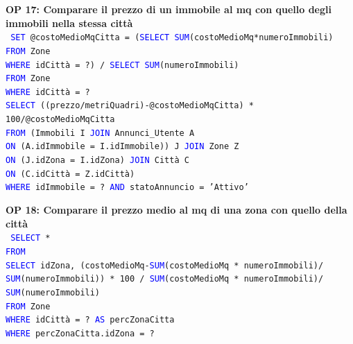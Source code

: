 \documentclass[a4paper,12pt]{report}
\begin{document}
            \noindent
            \textbf{OP 17: Comparare il prezzo di un immobile al mq con quello degli immobili nella stessa città} \\
            \texttt{
                \textcolor{blue}{SET} @costoMedioMqCitta = (\textcolor{blue}{SELECT SUM}(costoMedioMq*numeroImmobili) \\
                    \null\qquad\qquad\qquad\qquad\qquad\qquad\quad\textcolor{blue}{FROM} Zone \\
                    \null\qquad\qquad\qquad\qquad\qquad\qquad\quad\textcolor{blue}{WHERE} idCittà = ?) / \textcolor{blue}{SELECT SUM}(numeroImmobili) \\
                        \null\qquad\qquad\qquad\qquad\qquad\qquad\qquad\qquad\qquad\qquad\qquad\qquad\textcolor{blue}{FROM} Zone  \\
                        \null\qquad\qquad\qquad\qquad\qquad\qquad\qquad\qquad\qquad\qquad\qquad\qquad\textcolor{blue}{WHERE} idCittà = ? \\
                \textcolor{blue}{SELECT} ((prezzo/metriQuadri)-@costoMedioMqCitta) * 100/@costoMedioMqCitta \\
                \textcolor{blue}{FROM} (Immobili I \textcolor{blue}{JOIN} Annunci\_Utente A  \\
                \textcolor{blue}{ON} (A.idImmobile = I.idImmobile)) J \textcolor{blue}{JOIN} Zone Z \\
                \textcolor{blue}{ON} (J.idZona = I.idZona) \textcolor{blue}{JOIN} Città C \\
                \textcolor{blue}{ON} (C.idCittà = Z.idCittà) \\
                \textcolor{blue}{WHERE} idImmobile = ? \textcolor{blue}{AND} statoAnnuncio = 'Attivo' \\
            }

            \noindent
            \textbf{OP 18: Comparare il prezzo medio al mq di una zona con quello della città} \\
            \texttt{
                \textcolor{blue}{SELECT} * \\
                \textcolor{blue}{FROM}  \\
                \textcolor{blue}{SELECT} idZona, (costoMedioMq-\textcolor{blue}{SUM}(costoMedioMq * numeroImmobili)/ \\
                \textcolor{blue}{SUM}(numeroImmobili)) * 100 / \textcolor{blue}{SUM}(costoMedioMq * numeroImmobili)/ \\
                \textcolor{blue}{SUM}(numeroImmobili) \\
                \textcolor{blue}{FROM} Zone \\
                \textcolor{blue}{WHERE} idCittà = ? \textcolor{blue}{AS} percZonaCitta\\
                \textcolor{blue}{WHERE} percZonaCitta.idZona = ? \\
            }
\end{document}

